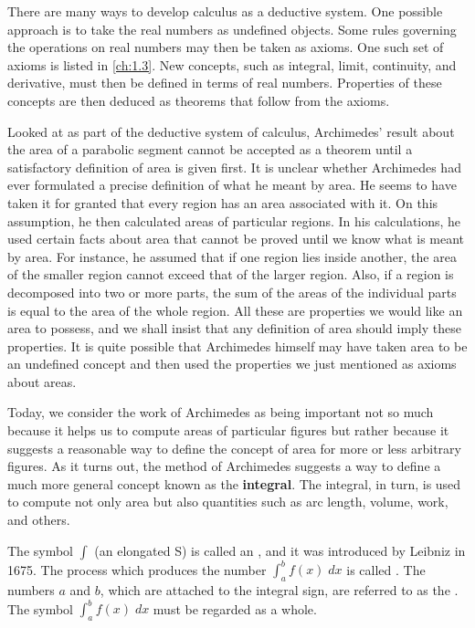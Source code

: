 \begin{note}
  There are many ways to develop calculus as a deductive system.
  One possible approach is to take the real numbers as undefined objects.
  Some rules governing the operations on real numbers may then be taken as axioms.
  One such set of axioms is listed in \cref{ch:1.3}.
  New concepts, such as integral, limit, continuity, and derivative, must then be defined in terms of real numbers.
  Properties of these concepts are then deduced as theorems that follow from the axioms.

  Looked at as part of the deductive system of calculus, Archimedes' result about the area of a parabolic segment cannot be accepted as a theorem until a satisfactory definition of area is given first.
  It is unclear whether Archimedes had ever formulated a precise definition of what he meant by area.
  He seems to have taken it for granted that every region has an area associated with it.
  On this assumption, he then calculated areas of particular regions.
  In his calculations, he used certain facts about area that cannot be proved until we know what is meant by area.
  For instance, he assumed that if one region lies inside another, the area of the smaller region cannot exceed that of the larger region.
  Also, if a region is decomposed into two or more parts, the sum of the areas of the individual parts is equal to the area of the whole region.
  All these are properties we would like an area to possess, and we shall insist that any definition of area should imply these properties.
  It is quite possible that Archimedes himself may have taken area to be an undefined concept and then used the properties we just mentioned as axioms about areas.

  Today, we consider the work of Archimedes as being important not so much because it helps us to compute areas of particular figures but rather because it suggests a reasonable way to define the concept of area for more or less arbitrary figures.
  As it turns out, the method of Archimedes suggests a way to define a much more general concept known as the \textbf{integral}.
  The integral, in turn, is used to compute not only area but also quantities such as arc length, volume, work, and others.

  The symbol \(\int\) (an elongated S) is called an \textbf{}, and it was introduced by Leibniz in 1675.
  The process which produces the number \(\int_a^b f(x) \; dx\) is called \textbf{}.
  The numbers \(a\) and \(b\), which are attached to the integral sign, are referred to as the \textbf{}.
  The symbol \(\int_a^b f(x) \; dx\) must be regarded as a whole.


\end{note}
